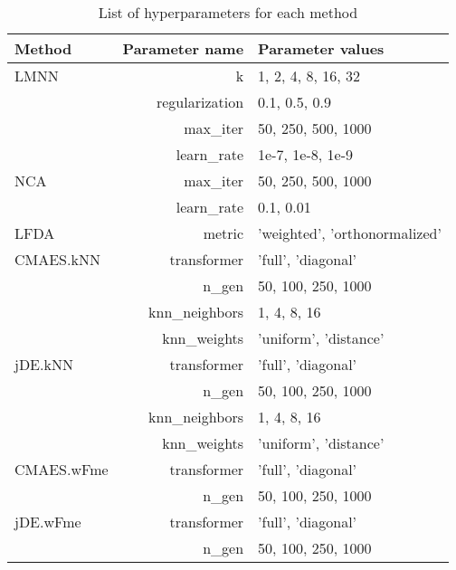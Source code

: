 \begin{table}[ht] \centering
\begin{tabular}{lrl}
\hline
Method & Parameter name & Parameter values \\
\hline

LMNN
    & k & 1, 2, 4, 8, 16, 32  \\
    & regularization & 0.1, 0.5, 0.9  \\
    & max\_iter & 50, 250, 500, 1000  \\
    & learn\_rate & 1e-7, 1e-8, 1e-9  \\
NCA
    & max\_iter & 50, 250, 500, 1000  \\
    & learn\_rate & 0.1, 0.01  \\

LFDA
    & metric & 'weighted', 'orthonormalized'  \\

CMAES.kNN
    & transformer & 'full', 'diagonal'  \\
    & n\_gen & 50, 100, 250, 1000  \\
    & knn\_neighbors & 1, 4, 8, 16  \\
    & knn\_weights & 'uniform', 'distance'  \\

jDE.kNN
    & transformer & 'full', 'diagonal'  \\
    & n\_gen & 50, 100, 250, 1000  \\
    & knn\_neighbors & 1, 4, 8, 16  \\
    & knn\_weights & 'uniform', 'distance'  \\

CMAES.wFme
    & transformer & 'full', 'diagonal'  \\
    & n\_gen & 50, 100, 250, 1000  \\

jDE.wFme
    & transformer & 'full', 'diagonal'  \\
    & n\_gen & 50, 100, 250, 1000  \\


\hline
\end{tabular}
\caption{List of hyperparameters for each method} \label{tab:hyperparams}
\end{table}
